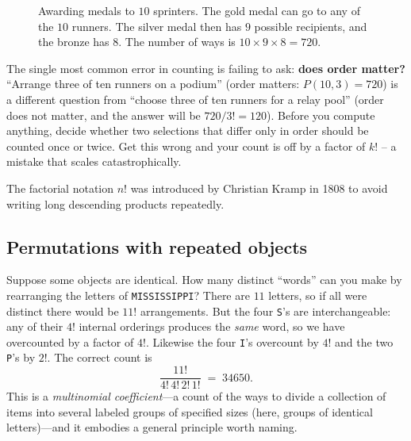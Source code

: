 \begin{figure}[H]
\centering
{}
\caption{Awarding medals to $10$ sprinters. The gold medal can go to any of the $10$ runners. The silver medal then has $9$ possible recipients, and the bronze has $8$. The number of ways is $10 \times 9 \times 8 = 720$.}
\label{ch2:fig-podium}
\end{figure}

\begin{trapbox}
The single most common error in counting is failing to ask: \textbf{does order matter?}
``Arrange three of ten runners on a podium'' (order matters: $P(10,3)=720$) is a different
question from ``choose three of ten runners for a relay pool'' (order does not matter, and
the answer will be $720/3! = 120$). Before you compute anything, decide whether two
selections that differ only in order should be counted once or twice. Get this wrong and
your count is off by a factor of $k!$ -- a mistake that scales catastrophically.
\end{trapbox}

The factorial notation $n!$ was introduced by Christian Kramp in 1808 to avoid writing
long descending products repeatedly.

\subsection{Permutations with repeated objects}

Suppose some objects are identical. How many distinct ``words'' can you make by rearranging
the letters of \texttt{MISSISSIPPI}? There are $11$ letters, so if all were distinct there
would be $11!$ arrangements. But the four \texttt{S}'s are interchangeable: any of their
$4!$ internal orderings produces the \emph{same} word, so we have overcounted by a factor
of $4!$. Likewise the four \texttt{I}'s overcount by $4!$ and the two \texttt{P}'s by $2!$.
The correct count is
\[
  \frac{11!}{4!\,4!\,2!\,1!} \;=\; 34650.
\]
This is a \emph{multinomial coefficient}---a count of the ways to divide a collection of
items into several labeled groups of specified sizes (here, groups of identical letters)---and
it embodies a general principle worth naming.


